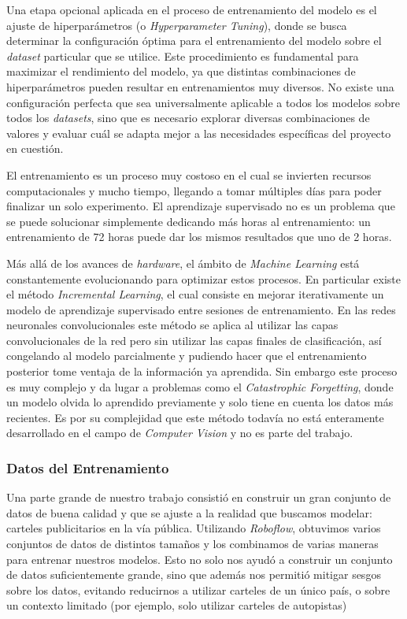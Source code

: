 \documentclass[a4paper]{article}
\begin{document}
Una etapa opcional aplicada en el proceso de entrenamiento del modelo es el ajuste de hiperparámetros (o \textit{Hyperparameter Tuning}), donde se busca determinar la configuración óptima para el entrenamiento del modelo sobre el \textit{dataset} particular que se utilice. Este procedimiento es fundamental para maximizar el rendimiento del modelo, ya que distintas combinaciones de hiperparámetros pueden resultar en entrenamientos muy diversos. No existe una configuración perfecta que sea universalmente aplicable a todos los modelos sobre todos los \textit{datasets}, sino que es necesario explorar diversas combinaciones de valores y evaluar cuál se adapta mejor a las necesidades específicas del proyecto en cuestión.\medskip

El entrenamiento es un proceso muy costoso en el cual se invierten recursos computacionales y mucho tiempo, llegando a tomar múltiples días para poder finalizar un solo experimento. El aprendizaje supervisado no es un problema que se puede solucionar simplemente dedicando más horas al entrenamiento: un entrenamiento de 72 horas puede dar los mismos resultados que uno de 2 horas.

Más allá de los avances de \textit{hardware}, el ámbito de \textit{Machine Learning} está constantemente evolucionando para optimizar estos procesos. En particular existe el método \textit{Incremental Learning}, el cual consiste en mejorar iterativamente un modelo de aprendizaje supervisado entre sesiones de entrenamiento. En las redes neuronales convolucionales este método se aplica al utilizar las capas convolucionales de la red pero sin utilizar las capas finales de clasificación, así congelando al modelo parcialmente y pudiendo hacer que el entrenamiento posterior tome ventaja de la información ya aprendida. Sin embargo este proceso es muy complejo y da lugar a problemas como el \textit{Catastrophic Forgetting}, donde un modelo olvida lo aprendido previamente y solo tiene en cuenta los datos más recientes. Es por su complejidad que este método todavía no está enteramente desarrollado en el campo de \textit{Computer Vision} y no es parte del trabajo.

\subsubsection{Datos del Entrenamiento}

Una parte grande de nuestro trabajo consistió en construir un gran conjunto de datos de buena calidad y que se ajuste a la realidad que buscamos modelar: carteles publicitarios en la vía pública. Utilizando \textit{Roboflow}, obtuvimos varios conjuntos de datos de distintos tamaños y los combinamos de varias maneras para entrenar nuestros modelos. Esto no solo nos ayudó a construir un conjunto de datos suficientemente grande, sino que además nos permitió mitigar sesgos sobre los datos, evitando reducirnos a utilizar carteles de un único país, o sobre un contexto limitado (por ejemplo, solo utilizar carteles de autopistas)
\end{document}
